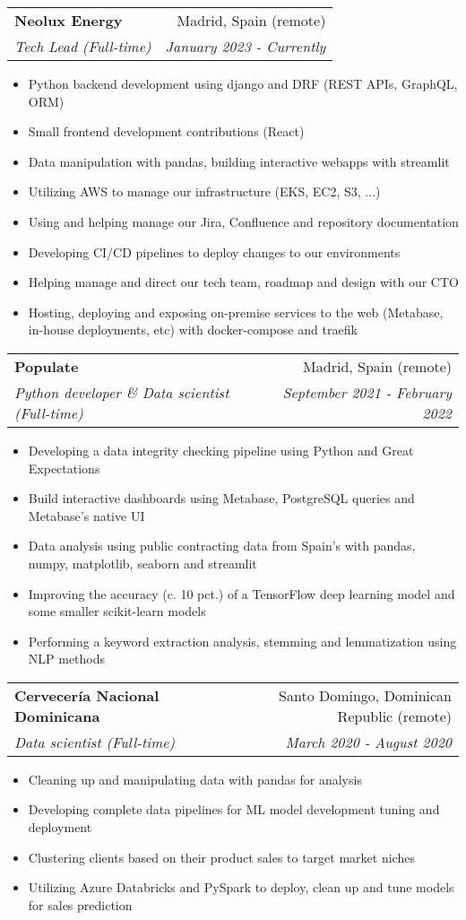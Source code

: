 \documentclass[a4paper,20pt]{article}
\makeatletter
\newcommand{\resumeSubheading}[4]{
  \vspace{-1pt}\item
    \begin{tabular*}{0.97\textwidth}{l@{\extracolsep{\fill}}r}
      \textbf{#1} & #2 \\
      \textit{#3} & \textit{#4} \\
    \end{tabular*}\vspace{-5pt}
}
\makeatother
\begin{document}
  \resumeSubheading{Neolux Energy}{Madrid, Spain (remote)}
    {Tech Lead (Full-time)}{January 2023 - Currently}
\begin{itemize} \itemsep-0.24em
  \item Python backend development using django and DRF (REST APIs, GraphQL, ORM)
  \item Small frontend development contributions (React)
  \item Data manipulation with pandas, building interactive webapps with streamlit
  \item Utilizing AWS to manage our infrastructure (EKS, EC2, S3, ...)
  \item Using and helping manage our Jira, Confluence and repository documentation
  \item Developing CI/CD pipelines to deploy changes to our environments
  \item Helping manage and direct our tech team, roadmap and design with our CTO
  \item Hosting, deploying and exposing on-premise services to the web (Metabase, in-house deployments, etc) with docker-compose and traefik
\end{itemize}
\vspace{-3pt}
  \resumeSubheading{Populate}{Madrid, Spain (remote)}
    {Python developer \& Data scientist (Full-time)}{September 2021 - February 2022}
\begin{itemize} \itemsep-0.24em
  \item Developing a data integrity checking pipeline using Python and Great Expectations
  \item Build interactive dashboards using Metabase, PostgreSQL queries and Metabase's native UI
  \item Data analysis using public contracting data from Spain's with pandas, numpy, matplotlib, seaborn and streamlit
  \item Improving the accuracy (c. 10 pct.) of a TensorFlow deep learning model and some smaller scikit-learn models
  \item Performing a keyword extraction analysis, stemming and lemmatization using NLP methods
\end{itemize}
\vspace{-3pt}
  \resumeSubheading{Cervecería Nacional Dominicana}{Santo Domingo, Dominican Republic (remote)}
    {Data scientist (Full-time)}{March 2020 - August 2020}
\begin{itemize} \itemsep-0.24em
  \item Cleaning up and manipulating data with pandas for analysis
  \item Developing complete data pipelines for ML model development tuning and deployment
  \item Clustering clients based on their product sales to target market niches
  \item Utilizing Azure Databricks and PySpark to deploy, clean up and tune models for sales prediction
\end{itemize}
\end{document}
